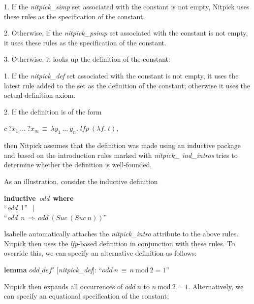 \documentclass[a4paper,12pt]{article}
\begin{document}
\begin{enum}
\item[1.] If the \textit{nitpick\_simp} set associated with the constant
is not empty, Nitpick uses these rules as the specification of the constant.

\item[2.] Otherwise, if the \textit{nitpick\_psimp} set associated with
the constant is not empty, it uses these rules as the specification of the
constant.

\item[3.] Otherwise, it looks up the definition of the constant:

\begin{enum}
\item[1.] If the \textit{nitpick\_def} set associated with the constant
is not empty, it uses the latest rule added to the set as the definition of the
constant; otherwise it uses the actual definition axiom.
\item[2.] If the definition is of the form

\qquad $c~{?}x_1~\ldots~{?}x_m \,\equiv\, \lambda y_1~\ldots~y_n.\; \textit{lfp}~(\lambda f.\; t)$,

then Nitpick assumes that the definition was made using an inductive package and
based on the introduction rules marked with \textit{nitpick\_\allowbreak
ind\_\allowbreak intros} tries to determine whether the definition is
well-founded.
\end{enum}
\end{enum}

As an illustration, consider the inductive definition

\prew
\textbf{inductive}~\textit{odd}~\textbf{where} \\
``\textit{odd}~1'' $\,\mid$ \\
``\textit{odd}~$n\,\Longrightarrow\, \textit{odd}~(\textit{Suc}~(\textit{Suc}~n))$''
\postw

Isabelle automatically attaches the \textit{nitpick\_intro} attribute to
the above rules. Nitpick then uses the \textit{lfp}-based definition in
conjunction with these rules. To override this, we can specify an alternative
definition as follows:

\prew
\textbf{lemma} $\mathit{odd\_def}'$ [\textit{nitpick\_def}]: ``$\textit{odd}~n \,\equiv\, n~\textrm{mod}~2 = 1$''
\postw

Nitpick then expands all occurrences of $\mathit{odd}~n$ to $n~\textrm{mod}~2
= 1$. Alternatively, we can specify an equational specification of the constant:
\end{document}
